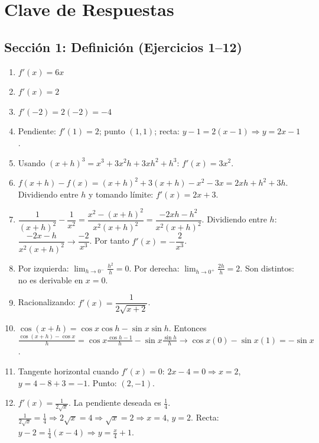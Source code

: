 \documentclass[12pt, a4paper]{article}
\begin{document}
\newpage

\section{Clave de Respuestas}

\subsection*{Sección 1: Definición (Ejercicios 1--12)}

\begin{enumerate}[leftmargin=*, label=\textbf{\arabic*.}]
  \item $f'(x) = 6x$
  \item $f'(x) = 2$
  \item $f'(-2) = 2(-2) = -4$
  \item Pendiente: $f'(1) = 2$; punto $(1,1)$; recta: $y - 1 = 2(x - 1) \Rightarrow y = 2x - 1$.
  \item Usando $(x+h)^3 = x^3 + 3x^2h + 3xh^2 + h^3$: $f'(x) = 3x^2$.
  \item $f(x+h) - f(x) = (x+h)^2 + 3(x+h) - x^2 - 3x = 2xh + h^2 + 3h$. Dividiendo entre $h$ y tomando límite: $f'(x) = 2x + 3$.
  \item $\dfrac{1}{(x+h)^2} - \dfrac{1}{x^2} = \dfrac{x^2 - (x+h)^2}{x^2(x+h)^2} = \dfrac{-2xh - h^2}{x^2(x+h)^2}$. Dividiendo entre $h$: $\dfrac{-2x - h}{x^2(x+h)^2} \to \dfrac{-2}{x^3}$. Por tanto $f'(x) = -\dfrac{2}{x^3}$.
  \item Por izquierda: $\lim_{h\to 0^-} \frac{h^2}{h} = 0$. Por derecha: $\lim_{h\to 0^+} \frac{2h}{h} = 2$. Son distintos: no es derivable en $x=0$.
  \item Racionalizando: $f'(x) = \dfrac{1}{2\sqrt{x+2}}$.
  \item $\cos(x+h) = \cos x \cos h - \sin x \sin h$. Entonces $\frac{\cos(x+h) - \cos x}{h} = \cos x \frac{\cos h - 1}{h} - \sin x \frac{\sin h}{h} \to \cos x(0) - \sin x(1) = -\sin x$.
  \item Tangente horizontal cuando $f'(x) = 0$: $2x - 4 = 0 \Rightarrow x = 2$, $y = 4 - 8 + 3 = -1$. Punto: $(2, -1)$.
  \item $f'(x) = \frac{1}{2\sqrt{x}}$. La pendiente deseada es $\frac{1}{4}$. $\frac{1}{2\sqrt{x}} = \frac{1}{4} \Rightarrow 2\sqrt{x} = 4 \Rightarrow \sqrt{x} = 2 \Rightarrow x = 4$, $y = 2$. Recta: $y - 2 = \frac{1}{4}(x - 4) \Rightarrow y = \frac{x}{4} + 1$.
\end{enumerate}
\end{document}
